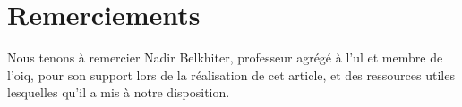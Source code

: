 \section*{Remerciements}
Nous tenons à remercier Nadir Belkhiter, professeur agrégé à l'\gls{ul} et membre de l'\gls{oiq}, pour son support lors de la réalisation de cet article, et des ressources utiles lesquelles qu'il a mis à notre disposition.
